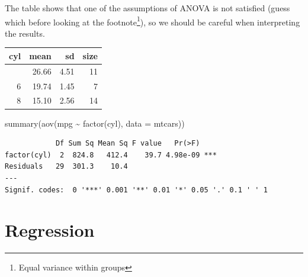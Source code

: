 \documentclass[
  letterpaper,
  DIV=11,
  numbers=noendperiod,
  oneside]{scrreprt}
\newenvironment{Shaded}{\begin{snugshade}}{\end{snugshade}}
\newcommand{\AttributeTok}[1]{\textcolor[rgb]{0.40,0.45,0.13}{#1}}
\newcommand{\FunctionTok}[1]{\textcolor[rgb]{0.28,0.35,0.67}{#1}}
\newcommand{\NormalTok}[1]{\textcolor[rgb]{0.00,0.23,0.31}{#1}}
\newcommand{\SpecialCharTok}[1]{\textcolor[rgb]{0.37,0.37,0.37}{#1}}
\begin{document}
The table shows that one of the assumptions of ANOVA is not satisfied
(guess which before looking at the footnote\footnote{Equal variance
  within groups}), so we should be careful when interpreting the
results.

\begin{longtable}[]{@{}rrrr@{}}
\toprule\noalign{}
cyl & mean & sd & size \\
\midrule\noalign{}
\endhead
\bottomrule\noalign{}
\endlastfoot
4 & 26.66 & 4.51 & 11 \\
6 & 19.74 & 1.45 & 7 \\
8 & 15.10 & 2.56 & 14 \\
\end{longtable}

\begin{Shaded}
\begin{Highlighting}[]
\FunctionTok{summary}\NormalTok{(}\FunctionTok{aov}\NormalTok{(mpg }\SpecialCharTok{\textasciitilde{}} \FunctionTok{factor}\NormalTok{(cyl), }\AttributeTok{data =}\NormalTok{ mtcars))}
\end{Highlighting}
\end{Shaded}

\begin{verbatim}
            Df Sum Sq Mean Sq F value   Pr(>F)    
factor(cyl)  2  824.8   412.4    39.7 4.98e-09 ***
Residuals   29  301.3    10.4                     
---
Signif. codes:  0 '***' 0.001 '**' 0.01 '*' 0.05 '.' 0.1 ' ' 1
\end{verbatim}

\hypertarget{regression-1}{%
\section{Regression}\label{regression-1}}
\end{document}
